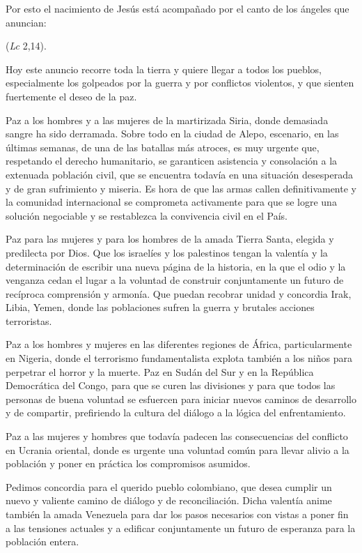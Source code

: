 Por esto el nacimiento de Jesús está acompañado por el canto de los ángeles que anuncian:

 (\emph{Lc} 2,14).

Hoy este anuncio recorre toda la tierra y quiere llegar a todos los pueblos, especialmente los golpeados por la guerra y por conflictos violentos, y que sienten fuertemente el deseo de la paz.

Paz a los hombres y a las mujeres de la martirizada Siria, donde demasiada sangre ha sido derramada. Sobre todo en la ciudad de Alepo, escenario, en las últimas semanas, de una de las batallas más atroces, es muy urgente que, respetando el derecho humanitario, se garanticen asistencia y consolación a la extenuada población civil, que se encuentra todavía en una situación desesperada y de gran sufrimiento y miseria. Es hora de que las armas callen definitivamente y la comunidad internacional se comprometa activamente para que se logre una solución negociable y se restablezca la convivencia civil en el País.

Paz para las mujeres y para los hombres de la amada Tierra Santa, elegida y predilecta por Dios. Que los israelíes y los palestinos tengan la valentía y la determinación de escribir una nueva página de la historia, en la que el odio y la venganza cedan el lugar a la voluntad de construir conjuntamente un futuro de recíproca comprensión y armonía. Que puedan recobrar unidad y concordia Irak, Libia, Yemen, donde las poblaciones sufren la guerra y brutales acciones terroristas.

Paz a los hombres y mujeres en las diferentes regiones de África, particularmente en Nigeria, donde el terrorismo fundamentalista explota también a los niños para perpetrar el horror y la muerte. Paz en Sudán del Sur y en la República Democrática del Congo, para que se curen las divisiones y para que todos las personas de buena voluntad se esfuercen para iniciar nuevos caminos de desarrollo y de compartir, prefiriendo la cultura del diálogo a la lógica del enfrentamiento.

Paz a las mujeres y hombres que todavía padecen las consecuencias del conflicto en Ucrania oriental, donde es urgente una voluntad común para llevar alivio a la población y poner en práctica los compromisos asumidos.

Pedimos concordia para el querido pueblo colombiano, que desea cumplir un nuevo y valiente camino de diálogo y de reconciliación. Dicha valentía anime también la amada Venezuela para dar los pasos necesarios con vistas a poner fin a las tensiones actuales y a edificar conjuntamente un futuro de esperanza para la población entera.

